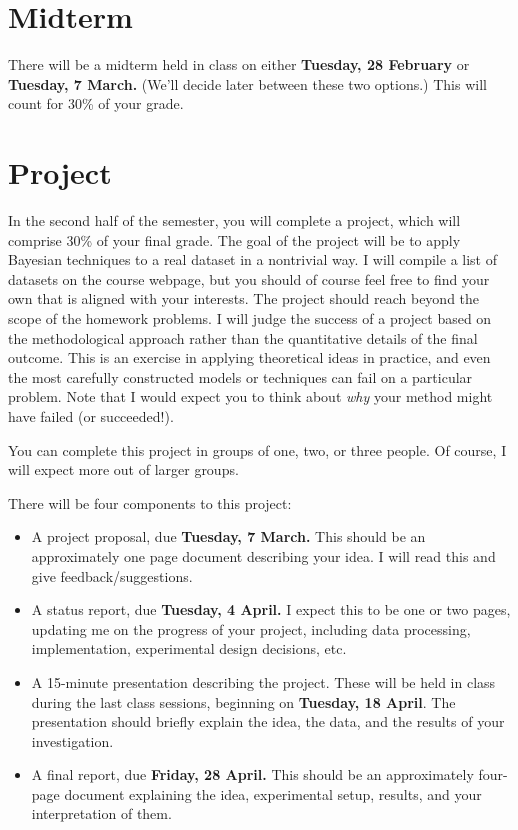 \documentclass{article}
\begin{document}
\section*{Midterm}

There will be a midterm held in class on either \textbf{Tuesday, 28
  February} or \textbf{Tuesday, 7 March.}  (We'll decide later between
these two options.)  This will count for 30\% of your grade.

\section*{Project}

In the second half of the semester, you will complete a project, which
will comprise 30\% of your final grade. The goal of the project will
be to apply Bayesian techniques to a real dataset in a nontrivial way.
I will compile a list of datasets on the course webpage, but you
should of course feel free to find your own that is aligned with your
interests.  The project should reach beyond the scope of the homework
problems.  I will judge the success of a project based on the
methodological approach rather than the quantitative details of the
final outcome.  This is an exercise in applying theoretical ideas in
practice, and even the most carefully constructed models or techniques
can fail on a particular problem.  Note that I would expect you to
think about \emph{why} your method might have failed (or succeeded!).

You can complete this project in groups of one, two, or three people.
Of course, I will expect more out of larger groups.

There will be four components to this project:
\begin{itemize}
\item A project proposal, due \textbf{Tuesday, 7 March.}  This should
  be an approximately one page document describing your idea.  I will
  read this and give feedback/suggestions.
\item A status report, due \textbf{Tuesday, 4 April.}  I expect this to
  be one or two pages, updating me on the progress of your project,
  including data processing, implementation, experimental design
  decisions, etc.
\item A 15-minute presentation describing the project.  These will be
  held in class during the last class sessions, beginning on
  \textbf{Tuesday, 18 April}.  The presentation should briefly explain
  the idea, the data, and the results of your investigation.
\item A final report, due \textbf{Friday, 28 April.}  This should be an
  approximately four-page document explaining the idea, experimental
  setup, results, and your interpretation of them.
\end{itemize}
\end{document}
